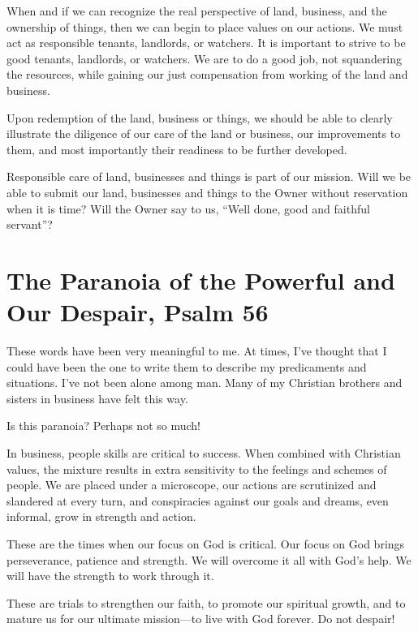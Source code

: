 \documentclass[12pt]{memoir}
\begin{document}
When and if we can recognize the real perspective of land, business, and the ownership of things, then we can begin to place values on
our actions. We must act as responsible tenants, landlords, or watchers. It is important to strive to be good tenants, landlords, or watchers.
We are to do a good job, not squandering the resources, while gaining our just compensation from working of the land and business.

Upon redemption of the land, business or things, we should be able
to clearly illustrate the diligence of our care of the land or business,
our improvements to them, and most importantly their readiness to be
further developed. 

Responsible care of land, businesses and things is part of our mission. Will we be able to submit our land, businesses and things to the Owner without reservation when it is time? Will the Owner say
to us, ``Well done, good and faithful servant''?


\section[Paranoia of Powerful and Despair]{The Paranoia of the Powerful and Our Despair, Psalm 56}
   

These words have been very meaningful to me. At times, I've thought that I could have been the one to write them to describe my predicaments and situations. I've not been alone among man. Many of my Christian brothers and sisters in business have felt this way.

Is this paranoia? Perhaps not so much!

In business, people skills are critical to success. When combined with Christian values, the mixture results in extra sensitivity to the feelings and schemes of people. We are placed under a microscope, our actions are scrutinized and slandered at every turn, and conspiracies
against our goals and dreams, even informal, grow in strength and action.

These are the times when our focus on God is critical. Our
focus on God brings perseverance, patience and strength. We will overcome
it all with God's help. We will have the strength to work through
it. 

These are trials to strengthen our faith, to promote our spiritual
growth, and to mature us for our ultimate mission---to live with
God forever. Do not despair!
\end{document}
